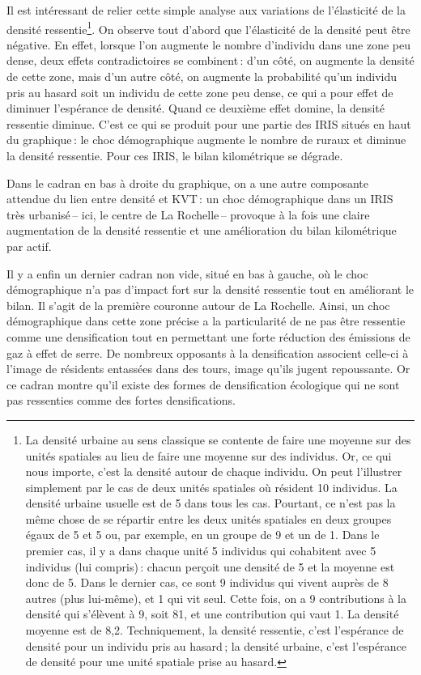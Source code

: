 \documentclass[
  9pt,
  a4paper,
  DIV=11]{scrreprt}
\begin{document}
Il est intéressant de relier cette simple analyse aux variations de
l'élasticité de la densité ressentie\footnote{La densité urbaine au sens
  classique se contente de faire une moyenne sur des unités spatiales au
  lieu de faire une moyenne sur des individus. Or, ce qui nous importe,
  c'est la densité autour de chaque individu. On peut l'illustrer
  simplement par le cas de deux unités spatiales où résident 10
  individus. La densité urbaine usuelle est de 5 dans tous les cas.
  Pourtant, ce n'est pas la même chose de se répartir entre les deux
  unités spatiales en deux groupes égaux de 5 et 5 ou, par exemple, en
  un groupe de 9 et un de 1. Dans le premier cas, il y a dans chaque
  unité 5 individus qui cohabitent avec 5 individus (lui compris)\,:
  chacun perçoit une densité de 5 et la moyenne est donc de 5. Dans le
  dernier cas, ce sont 9 individus qui vivent auprès de 8 autres (plus
  lui-même), et 1 qui vit seul. Cette fois, on a 9 contributions à la
  densité qui s'élèvent à 9, soit 81, et une contribution qui vaut 1. La
  densité moyenne est de 8,2. Techniquement, la densité ressentie, c'est
  l'espérance de densité pour un individu pris au hasard\,; la densité
  urbaine, c'est l'espérance de densité pour une unité spatiale prise au
  hasard.}. On observe tout d'abord que l'élasticité de la densité peut
être négative. En effet, lorsque l'on augmente le nombre d'individu dans
une zone peu dense, deux effets contradictoires se combinent\,: d'un
côté, on augmente la densité de cette zone, mais d'un autre côté, on
augmente la probabilité qu'un individu pris au hasard soit un individu
de cette zone peu dense, ce qui a pour effet de diminuer l'espérance de
densité. Quand ce deuxième effet domine, la densité ressentie diminue.
C'est ce qui se produit pour une partie des IRIS situés en haut du
graphique\,: le choc démographique augmente le nombre de ruraux et
diminue la densité ressentie. Pour ces IRIS, le bilan kilométrique se
dégrade.

Dans le cadran en bas à droite du graphique, on a une autre composante
attendue du lien entre densité et KVT\,: un choc démographique dans un
IRIS très urbanisé\,-- ici, le centre de La Rochelle\,-- provoque à la
fois une claire augmentation de la densité ressentie et une amélioration
du bilan kilométrique par actif.

Il y a enfin un dernier cadran non vide, situé en bas à gauche, où le
choc démographique n'a pas d'impact fort sur la densité ressentie tout
en améliorant le bilan. Il s'agit de la première couronne autour de La
Rochelle. Ainsi, un choc démographique dans cette zone précise a la
particularité de ne pas être ressentie comme une densification tout en
permettant une forte réduction des émissions de gaz à effet de serre. De
nombreux opposants à la densification associent celle-ci à l'image de
résidents entassées dans des tours, image qu'ils jugent repoussante. Or
ce cadran montre qu'il existe des formes de densification écologique qui
ne sont pas ressenties comme des fortes densifications.
\end{document}
